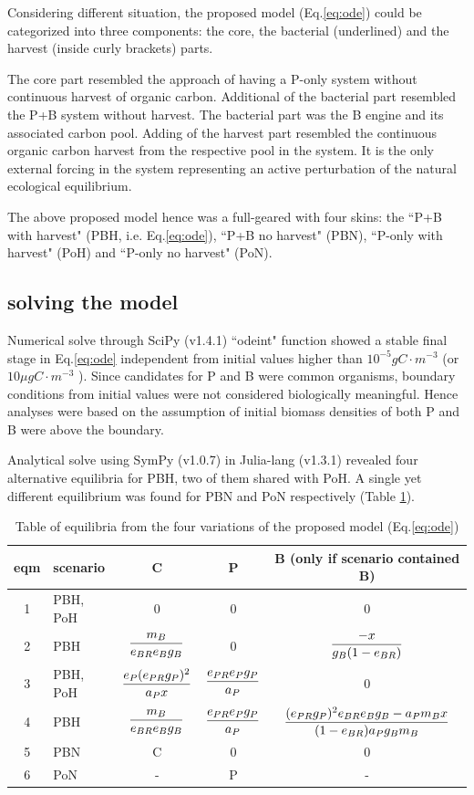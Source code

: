 \documentclass[../thesis.tex]{subfiles} %
\begin{document}
Considering different situation, the proposed model (Eq.\ref{eq:ode}) could be categorized into three components: the core, the bacterial (underlined) and the harvest (inside curly brackets) parts.

The core part resembled the approach of having a P-only system without continuous harvest of organic carbon.  Additional of the bacterial part resembled the P+B system without harvest.  The bacterial part was the B engine and its associated carbon pool.  Adding of the harvest part resembled the continuous organic carbon harvest from the respective pool in the system.  It is the only external forcing in the system representing an active perturbation of the natural ecological equilibrium.

The above proposed model hence was a full-geared with four skins: the ``P+B with harvest" (PBH, i.e. Eq.\ref{eq:ode}), ``P+B no harvest" (PBN), ``P-only with harvest" (PoH) and ``P-only no harvest" (PoN).

\subsection{solving the model}
Numerical solve through SciPy (v1.4.1) ``odeint" function showed a stable final stage in Eq.\ref{eq:ode} independent from initial values higher than $10^{-5}gC\cdot m^{-3}$ (or $10\mu gC\cdot m^{-3}$ ).  Since candidates for P and B were common organisms, boundary conditions from initial values were not considered biologically meaningful.  Hence analyses were based on the assumption of initial biomass densities of both P and B were above the boundary.

Analytical solve using SymPy (v1.0.7) in Julia-lang (v1.3.1) revealed four alternative equilibria for PBH, two of them shared with PoH.  A single yet different equilibrium was found for PBN and PoN respectively (Table \ref{tab:eqm}).

\begin{table}[H]
    \centering
    \caption{Table of equilibria from the four variations of the proposed model (Eq.\ref{eq:ode})}
    \begin{tabular}{cl|ccc}\hline
        eqm & scenario & C & P & B (only if scenario contained B) \\\hline
        1 & PBH, PoH & 0 & 0 & 0 \\
        2 & PBH & $\dfrac{m_B}{e_{BR}e_Bg_B}$ & 0 & $\dfrac{-x}{g_B(1-e_{BR})}$ \\
        3 & PBH, PoH & $\dfrac{e_P(e_{PR}g_P)^2}{a_P x}$ & $\dfrac{e_{PR}e_Pg_P}{a_P}$ & 0 \\
        4 & PBH & $\dfrac{m_B}{e_{BR}e_Bg_B}$ & $\dfrac{e_{PR}e_Pg_P}{a_P}$ & $\dfrac{(e_{PR}g_P)^2e_{BR}e_Bg_B-a_Pm_B x}{(1-e_{BR})a_Pg_Bm_B}$ \\
        5 & PBN & C & 0 & 0 \\
        6 & PoN & - & P & - \\\hline
    \end{tabular}
    \label{tab:eqm}
\end{table}
\end{document}
